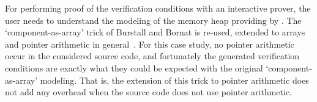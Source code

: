 For performing proof of the verification conditions with an
interactive prover, the user needs to understand the
modeling of the memory heap providing by \caduceus{}. The
`component-as-array' trick of Burstall and Bornat is re-used, extended
to arrays and pointer arithmetic in
general~\cite{filliatre04icfem}. For this case study, no pointer
arithmetic occur in the considered source code, and fortunately the
generated verification conditions are exactly what they could be
expected with the original `component-as-array' modeling. That is, the
extension of this trick to pointer arithmetic does not add any
overhead when the source code does not use pointer arithmetic.


